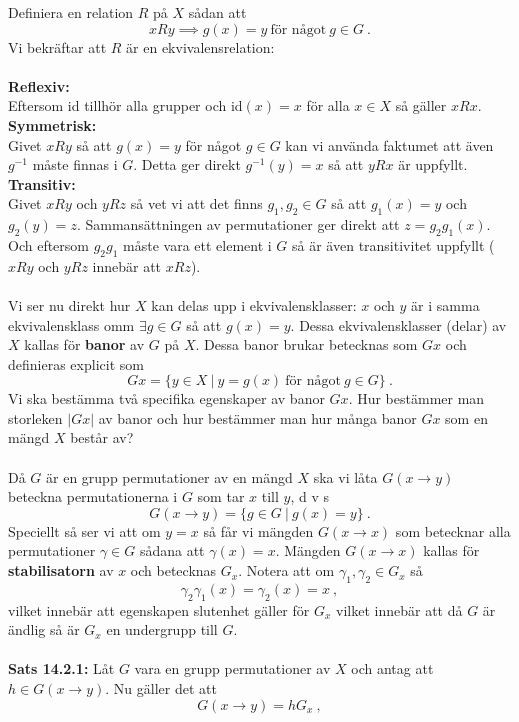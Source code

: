 \documentclass{article}
\begin{document}
Definiera en relation $R$ på $X$ sådan att
$$
xRy \implies g(x)=y \ \textrm{för något} \ g\in G \ .
$$
Vi bekräftar att $R$ är en ekvivalensrelation:
\\ \\
\textbf{Reflexiv:}
\\
Eftersom id tillhör alla grupper och id$(x)=x$ för alla $x\in X$ så gäller $xRx$.
\\
\textbf{Symmetrisk:}
\\
Givet $xRy$ så att $g(x)=y$ för något $g\in G$ kan vi använda faktumet att även $g^{-1}$ måste finnas i $G$. Detta ger direkt $g^{-1}(y)=x$ så att $yRx$ är uppfyllt.
\\
\textbf{Transitiv:}
\\
Givet $xRy$ och $yRz$ så vet vi att det finns $g_1,g_2\in G$ så att $g_1(x)=y$ och $g_2(y)=z$. Sammansättningen av permutationer ger direkt att $z=g_2g_1(x)$. Och eftersom $g_2g_1$ måste vara ett element i $G$ så är även transitivitet uppfyllt ($xRy$ och $yRz$ innebär att $xRz$).
\\ \\
Vi ser nu direkt hur $X$ kan delas upp i ekvivalensklasser: $x$ och $y$ är i samma ekvivalensklass omm $\exists g\in G$ så att $g(x)=y$. Dessa ekvivalensklasser (delar) av $X$ kallas för \textbf{banor} av $G$ på $X$. Dessa banor brukar betecknas som $Gx$ och definieras explicit som
$$
Gx=\{y\in X \ | \ y=g(x) \ \textrm{för något} \ g\in G\} \ .
$$
Vi ska bestämma två specifika egenskaper av banor $Gx$. Hur bestämmer man storleken $|Gx|$ av banor och hur bestämmer man hur många banor $Gx$ som en mängd $X$ består av?
\\ \\
Då $G$ är en grupp permutationer av en mängd $X$ ska vi låta $G(x\rightarrow y)$ beteckna permutationerna i  $G$ som tar  $x$ till $y$, d v s 
$$
G(x\rightarrow y)=\{g\in G \ | \ g(x)=y\} \ .
$$
Speciellt så ser vi att om $y=x$ så får vi mängden $G(x\rightarrow x)$ som betecknar alla permutationer $\gamma\in G$ sådana att $\gamma(x)=x$. Mängden $G(x\rightarrow x)$ kallas för \textbf{stabilisatorn} av $x$ och betecknas $G_x$. Notera att om $\gamma_1,\gamma_2\in G_x$ så
$$
\gamma_2\gamma_1(x)=\gamma_2(x)=x \ ,
$$
vilket innebär att egenskapen slutenhet gäller för $G_x$ vilket innebär att då $G$ är ändlig så är $G_x$ en undergrupp till $G$.
\\ \\
\textbf{Sats 14.2.1:} Låt $G$ vara en grupp permutationer av $X$ och antag att $h\in G(x\rightarrow y)$. Nu gäller det att
$$
G(x\rightarrow y)=hG_x \ ,
$$
\end{document}
